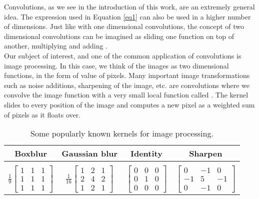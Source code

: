 \documentclass{article}
\begin{document}
Convolutions, as we see in the introduction of this work, are an extremely general idea. The expression used in Equation \ref{eq1} can also be used in a higher number of dimensions. Just like with one dimensional convolutions, the concept of two dimensional convolutions can be imagined as sliding one function on top of another, multiplying and adding \cite{twds}. \\

Our subject of interest, and one of the common application of convolutions is image processing. In this case, we think of the images as two dimensional functions, in the form of value of pixels. Many important image transformations such as noise additions, sharpening of the image, etc. are convolutions where we convolve the image function with a very small local function called . The kernel slides to every position of the image and computes a new pixel as a weighted sum of pixels as it floats over.\\

\begin{table}[]\caption{Some popularly known kernels for image processing.}\label{tab1}
\centering
\begin{tabular}{ c c c c }
\toprule
\textbf{Boxblur} & \textbf{Gaussian blur} &\textbf{Identity} & \textbf{Sharpen} \\
\midrule\\
\addlinespace[-2ex]
$ \frac{1}{9}\begin{bmatrix}  1 & 1 & 1\\ 1 &  1 & 1 \\ 1 & 1 & 1\end{bmatrix}$ &
$\frac{1}{16} \begin{bmatrix} 1 & 2 & 1 \\ 2 & 4 & 2 \\ 1 & 2 & 1 \end{bmatrix}$&
$ \begin{bmatrix} 0 & 0 & 0 \\ 0 & 1 & 0 \\ 0 & 0 & 0 \end{bmatrix}$&
$ \begin{bmatrix} 0 & -1 & 0 \\ -1 & 5 & -1 \\ 0 & -1 & 0 \end{bmatrix}$\\
\bottomrule
\end{tabular}
\end{table}
\end{document}
